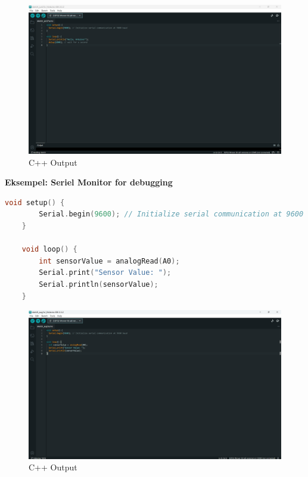 \clearpage
\begin{figure}[h!]
	\centering
	\includegraphics[width=\textwidth]{fig/fig1.png}
	\caption{C++ Output}
	\label{fig:1}
\end{figure}

\noindent\textbf{Eksempel: Seriel Monitor for debugging}
\begin{lstlisting}[language=C++]
	void setup() {
		Serial.begin(9600); // Initialize serial communication at 9600 baud
	}
	
	void loop() {
		int sensorValue = analogRead(A0);
		Serial.print("Sensor Value: ");
		Serial.println(sensorValue);
	}
\end{lstlisting}
\clearpage
\begin{figure}[h!]
	\centering
	\includegraphics[width=\textwidth]{fig/fig21.png}
	\caption{C++ Output}
	\label{fig:21}
\end{figure}

